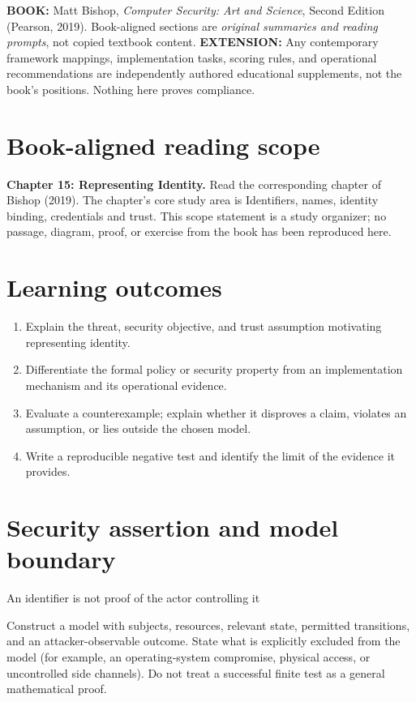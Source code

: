 \documentclass[10pt,letterpaper]{article}
\begin{document}
\makedoctocpage
\begin{notebox}
\textbf{BOOK:} Matt Bishop, \emph{Computer Security: Art and Science}, Second Edition (Pearson, 2019). Book-aligned sections are \emph{original summaries and reading prompts}, not copied textbook content.
\textbf{EXTENSION:} Any contemporary framework mappings, implementation tasks, scoring rules, and operational recommendations are independently authored educational supplements, not the book's positions. Nothing here proves compliance.
\end{notebox}
\section{Book-aligned reading scope}
\textbf{Chapter 15: Representing Identity.} Read the corresponding chapter of Bishop (2019). The chapter's core study area is Identifiers, names, identity binding, credentials and trust. This scope statement is a study organizer; no passage, diagram, proof, or exercise from the book has been reproduced here.
\section{Learning outcomes}
\begin{enumerate}
\item Explain the threat, security objective, and trust assumption motivating representing identity.
\item Differentiate the formal policy or security property from an implementation mechanism and its operational evidence.
\item Evaluate a counterexample; explain whether it disproves a claim, violates an assumption, or lies outside the chosen model.
\item Write a reproducible negative test and identify the limit of the evidence it provides.
\end{enumerate}
\section{Security assertion and model boundary}
\begin{infobox}
An identifier is not proof of the actor controlling it
\end{infobox}
Construct a model with subjects, resources, relevant state, permitted transitions, and an attacker-observable outcome. State what is explicitly excluded from the model (for example, an operating-system compromise, physical access, or uncontrolled side channels). Do not treat a successful finite test as a general mathematical proof.
\end{document}
